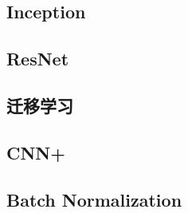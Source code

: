 \subsection{Inception}
\subsection{ResNet}
\subsection{迁移学习}
\subsection{CNN+}



\subsection{Batch Normalization}


